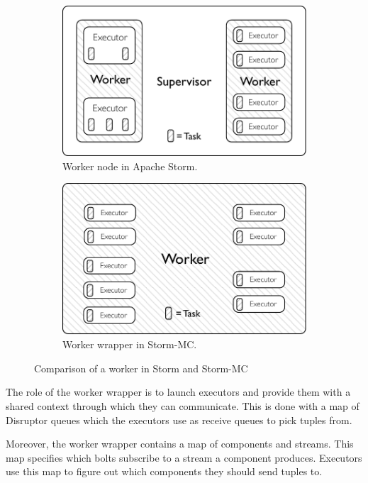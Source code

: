 \begin{figure}[!htb]
\centering
\begin{subfigure}{.5\textwidth}
  \centering
  \includegraphics[width=0.95\linewidth]{pdf/distributed_worker.pdf}
  \caption{Worker node in Apache Storm.}
  \label{fig:comparison1}
\end{subfigure}%
\begin{subfigure}{.5\textwidth}
  \centering
  \includegraphics[width=0.95\linewidth]{pdf/local_worker.pdf}
  \caption{Worker wrapper in Storm-MC.}
  \label{fig:comparison2}
\end{subfigure}
\caption{Comparison of a worker in Storm and Storm-MC}
\label{fig:comparison}
\end{figure}

The role of the worker wrapper is to launch executors and provide them with a shared context through which they can communicate. This is done with a map of Disruptor queues which the executors use as receive queues to pick tuples from.

Moreover, the worker wrapper contains a map of components and streams. This map specifies which bolts subscribe to a stream a component produces. Executors use this map to figure out which components they should send tuples to.

